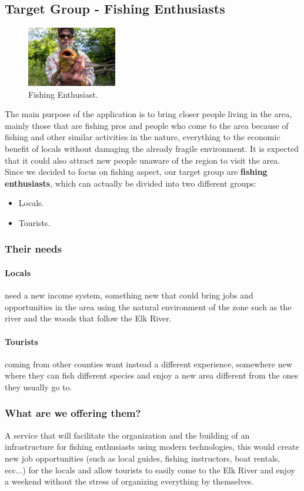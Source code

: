 \subsection{Target Group - Fishing Enthusiasts}
\label{TargetGroup}
\begin{figure}
\vspace{-\baselineskip}
\centering
\includegraphics[width=0.35\textwidth]{Img/FishingEnthusiast}
\caption{Fishing Enthusiast.}
\end{figure} 
The main purpose of the application is to bring closer people living in the area, mainly those that are fishing pros and people who come to the area because of fishing and other similar activities in the nature, everything to the economic benefit of locals without damaging the already fragile environment. It is expected that it could also attract new people unaware of the region to visit the area. 
Since we decided to focus on fishing aspect, our target group are \textbf{fishing enthusiasts}, which can actually be divided into two different groups:
\begin{itemize}
\item Locals.
\item Tourists.
\end{itemize}
\subsubsection{Their needs}
\paragraph*{Locals} need a new income system, something new that could bring jobs and opportunities in the area using
the natural environment of the zone such as the river and the woods that follow the Elk River.
\paragraph*{Tourists} coming from other counties want instead a different experience, somewhere new where
they can fish different species and enjoy a new area different from the ones they usually go to.
\subsubsection{What are we offering them?}
A service that will facilitate the organization and the building of an infrastructure for fishing enthusiasts using
modern technologies, this would create new job opportunities (such as local guides, fishing instructors,
boat rentals, ecc...) for the locals and allow tourists to easily come to the Elk River and enjoy
a weekend without the stress of organizing everything by themselves.
